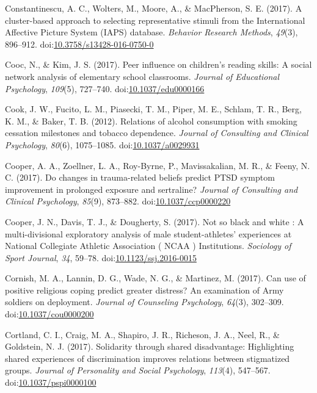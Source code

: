 \documentclass[english,man]{apa6}
\begin{document}
\hypertarget{ref-Constantinescu2017}{}
Constantinescu, A. C., Wolters, M., Moore, A., \& MacPherson, S. E.
(2017). A cluster-based approach to selecting representative stimuli
from the International Affective Picture System (IAPS) database.
\emph{Behavior Research Methods}, \emph{49}(3), 896--912.
doi:\href{https://doi.org/10.3758/s13428-016-0750-0}{10.3758/s13428-016-0750-0}

\hypertarget{ref-Cooc2017}{}
Cooc, N., \& Kim, J. S. (2017). Peer influence on children's reading
skills: A social network analysis of elementary school classrooms.
\emph{Journal of Educational Psychology}, \emph{109}(5), 727--740.
doi:\href{https://doi.org/10.1037/edu0000166}{10.1037/edu0000166}

\hypertarget{ref-Cook2012}{}
Cook, J. W., Fucito, L. M., Piasecki, T. M., Piper, M. E., Schlam, T.
R., Berg, K. M., \& Baker, T. B. (2012). Relations of alcohol
consumption with smoking cessation milestones and tobacco dependence.
\emph{Journal of Consulting and Clinical Psychology}, \emph{80}(6),
1075--1085.
doi:\href{https://doi.org/10.1037/a0029931}{10.1037/a0029931}

\hypertarget{ref-Cooper2017a}{}
Cooper, A. A., Zoellner, L. A., Roy-Byrne, P., Mavissakalian, M. R., \&
Feeny, N. C. (2017). Do changes in trauma-related beliefs predict PTSD
symptom improvement in prolonged exposure and sertraline? \emph{Journal
of Consulting and Clinical Psychology}, \emph{85}(9), 873--882.
doi:\href{https://doi.org/10.1037/ccp0000220}{10.1037/ccp0000220}

\hypertarget{ref-Cooper2017}{}
Cooper, J. N., Davis, T. J., \& Dougherty, S. (2017). Not so black and
white : A multi-divisional exploratory analysis of male
student-athletes' experiences at National Collegiate Athletic
Association ( NCAA ) Institutions. \emph{Sociology of Sport Journal},
\emph{34}, 59--78.
doi:\href{https://doi.org/10.1123/ssj.2016-0015}{10.1123/ssj.2016-0015}

\hypertarget{ref-Cornish2017}{}
Cornish, M. A., Lannin, D. G., Wade, N. G., \& Martinez, M. (2017). Can
use of positive religious coping predict greater distress? An
examination of Army soldiers on deployment. \emph{Journal of Counseling
Psychology}, \emph{64}(3), 302--309.
doi:\href{https://doi.org/10.1037/cou0000200}{10.1037/cou0000200}

\hypertarget{ref-Cortland2017}{}
Cortland, C. I., Craig, M. A., Shapiro, J. R., Richeson, J. A., Neel,
R., \& Goldstein, N. J. (2017). Solidarity through shared disadvantage:
Highlighting shared experiences of discrimination improves relations
between stigmatized groups. \emph{Journal of Personality and Social
Psychology}, \emph{113}(4), 547--567.
doi:\href{https://doi.org/10.1037/pspi0000100}{10.1037/pspi0000100}
\end{document}
